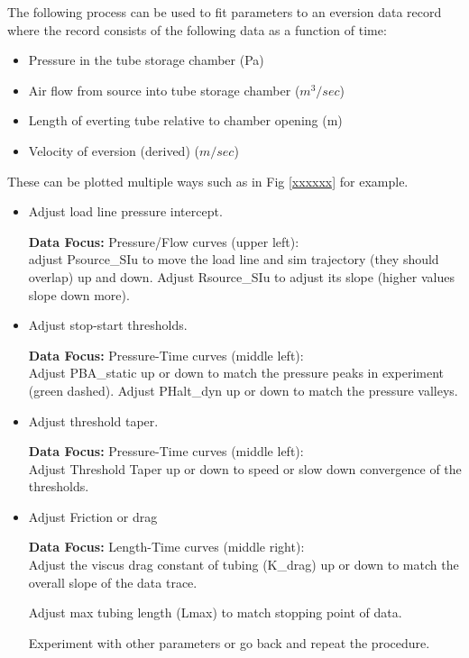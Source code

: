 
The following process can be used to fit parameters to an eversion data record where the record consists of
the following data as a function of time:

\begin{itemize}
    \item Pressure in the tube storage chamber (Pa)
    \item Air flow from source into tube storage chamber ($m^3/sec$)
    \item Length of everting tube relative to chamber opening (m)
    \item Velocity of eversion (derived) ($m/sec$)
\end{itemize}

These can be plotted multiple ways such as in Fig \ref{xxxxxx} for example.


\begin{itemize}
    \item  Adjust load line pressure intercept.

    {\bf Data Focus: } Pressure/Flow curves (upper left):\\
    adjust Psource_SIu to move the load line and sim trajectory (they should overlap)
    up and down.  Adjust Rsource_SIu to adjust its slope (higher values slope down more).

    \item Adjust stop-start thresholds.

     {\bf Data Focus: } Pressure-Time curves (middle left):\\
    Adjust PBA_static up or down to match the pressure peaks in experiment (green dashed).
    Adjust PHalt_dyn  up or down to match the pressure valleys.

    \item Adjust threshold taper.

     {\bf Data Focus: } Pressure-Time curves (middle left):\\
    Adjust Threshold Taper up or down to speed or slow down convergence of the thresholds.

    \item Adjust Friction or drag

     {\bf Data Focus: } Length-Time curves (middle right):\\
    Adjust the viscus drag constant of tubing (K_drag) up or down to match the overall slope
    of the data trace.

    Adjust max tubing length (Lmax) to match stopping point of data.

    \tiem Experiment with other parameters or go back and repeat the procedure.

\end{itemize}
